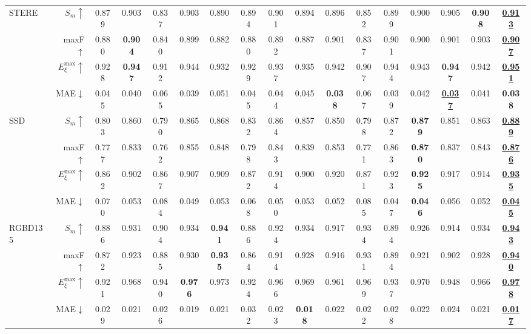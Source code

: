 \documentclass[10pt,twocolumn,letterpaper]{article}
\def\blu#1{\textbf{\color{blue} #1}} \def\red#1{\textbf{\color{red}\underline{#1}}}
\begin{document}
\begin{table*}[t]
\begin{tabular}{lr|cccccccccccccc|c}
  \multirow{4}{*}{STERE}
    & $S_m\uparrow$   &0.879 &0.903 &0.837 &0.903 &0.890 &0.894 &0.901 &0.894 &0.896 &0.852 &0.899 &0.900 &0.905 &\blu{0.908} &\red{0.913} \\
    & maxF$\uparrow$  &0.880 &\blu{0.904} &0.840 &0.899 &0.882 &0.880 &0.892 &0.887 &0.901 &0.837 &0.901 &0.900 &0.901 &0.903 &\red{0.907} \\
    & $E_{\xi}^{\text{max}}\uparrow$ &0.928 &\blu{0.947} &0.912 &0.944 &0.932 &0.929 &0.937 &0.935 &0.942 &0.907 &0.944 &0.943 &\blu{0.947} &0.942 &\red{0.951} \\
    \cite{niu2012stere}  & MAE$\downarrow$ &0.045 &0.040 &0.065 &0.039 &0.051 &0.045 &0.044 &0.045 &\blu{0.038} &0.067 &0.039 &0.042 &\red{0.037} &0.041 &\blu{0.038}\\
     \hline

  \multirow{4}{*}{SSD}
    & $S_m\uparrow$   &0.803 &0.860 &0.790 &0.865 &0.868 &0.832 &0.864 &0.857 &0.850 &0.798 &0.872 &\blu{0.879} &0.851 &0.863 &\red{0.889}\\
    & maxF$\uparrow$  &0.777 &0.833 &0.762 &0.855 &0.848 &0.798 &0.843 &0.839 &0.853 &0.771 &0.863 &\blu{0.870} &0.837 &0.843 &\red{0.876} \\
    & $E_{\xi}^{\text{max}}\uparrow$  &0.862 &0.902 &0.867 &0.907 &0.909 &0.872 &0.914 &0.900 &0.920 &0.871 &0.923 &\blu{0.925} &0.917 &0.914 &\red{0.935}\\
    \cite{zhu2017ssd}& MAE$\downarrow$ &0.070 &0.053 &0.084 &0.049 &0.053 &0.068 &0.050 &0.053 &0.052 &0.085 &0.047 &\blu{0.046} &0.056 &0.052 &\red{0.045}\\
     \hline

  \multirow{4}{*}{RGBD135}
    & $S_m\uparrow$   &0.886 &0.931 &0.904 &0.934 &\blu{0.941} &0.886 &0.924 &0.934 &0.917 &0.934 &0.894 &0.926 &0.914 &0.934 &\red{0.943}\\
    & maxF$\uparrow$  &0.872 &0.923 &0.885 &0.930 &\blu{0.935} &0.864 &0.914 &0.928 &0.916 &0.931 &0.894 &0.921 &0.902 &0.928 &\red{0.940} \\
    & $E_{\xi}^{\text{max}}\uparrow$ &0.921 &0.968 &0.940 &\blu{0.976} &0.973 &0.924 &0.966 &0.969 &0.961 &0.969 &0.937 &0.970 &0.948 &0.966 &\red{0.978} \\
    \cite{cheng2014rgbd135}& MAE$\downarrow$ &0.029 &0.021 &0.026 &0.019 &0.021 &0.032 &0.023 &\blu{0.018} &0.022 &0.022 &0.028 &0.022 &0.024 &0.021 &\red{0.017} \\
     \hline


\end{tabular}
\end{table*}
\end{document}

